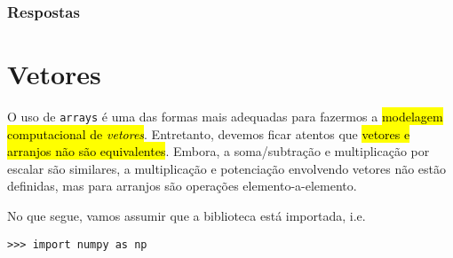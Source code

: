 \ifisbook
\subsubsection{Respostas}
\shipoutAnswer
\fi


\section{Vetores}\label{cap_arr_sec_vetor}

O uso de \texttt{arrays} é uma das formas mais adequadas para fazermos a \hl{modelagem computacional de \emph{vetores}}. Entretanto, devemos ficar atentos que \hl{vetores e arranjos não são equivalentes}. Embora, a soma/subtração e multiplicação por escalar são similares, a multiplicação e potenciação envolvendo vetores não estão definidas, mas para arranjos são operações elemento-a-elemento.

No que segue, vamos assumir que a biblioteca {\numpy} está importada, i.e.

\begin{lstlisting}
>>> import numpy as np
\end{lstlisting}

